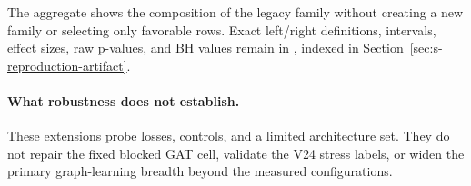 

The aggregate shows the composition of the legacy family without creating a new family or selecting only favorable rows. Exact left/right definitions, intervals, effect sizes, raw p-values, and BH values remain in , indexed in Section~\ref{sec:s-reproduction-artifact}.

\paragraph{What robustness does not establish.}
These extensions probe losses, controls, and a limited architecture set. They do not repair the fixed blocked GAT cell, validate the V24 stress labels, or widen the primary graph-learning breadth beyond the measured configurations.
